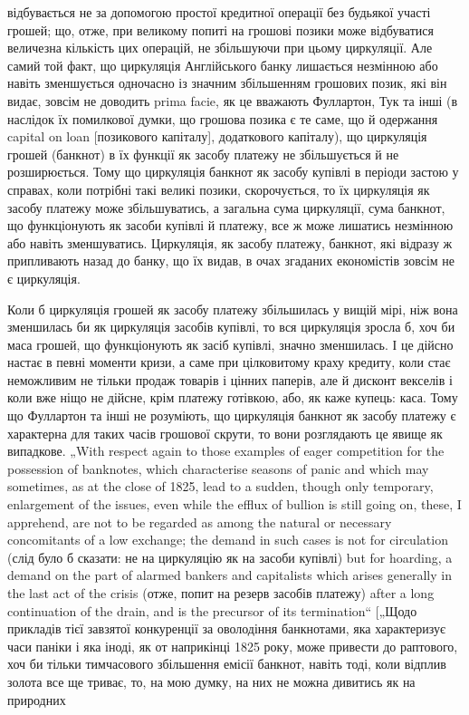 \parcont{}  %
відбувається не за допомогою простої кредитної операції без
будьякої участі грошей; що, отже, при великому попиті на грошові
позики може відбуватися величезна кількість цих операцій,
не збільшуючи при цьому циркуляції. Але самий той факт,
що циркуляція Англійського банку лишається незмінною або
навіть зменшується одночасно із значним збільшенням грошових
позик, які він видає, зовсім не доводить prima facie,
як це вважають Фуллартон, Тук та інші (в наслідок їх
помилкової думки, що грошова позика є те саме, що й одержання
capital on loan [позикового капіталу], додаткового капіталу), що
циркуляція грошей (банкнот) в їх функції як засобу платежу
не збільшується й не розширюється. Тому що циркуляція банкнот
як засобу купівлі в періоди застою у справах, коли потрібні такі
великі позики, скорочується, то їх циркуляція як засобу платежу
може збільшуватись, а загальна сума циркуляції, сума банкнот,
що функціонують як засоби купівлі й платежу, все ж може
лишатись незмінною або навіть зменшуватись. Циркуляція, як
засобу платежу, банкнот, які відразу ж припливають назад до
банку, що їх видав, в очах згаданих економістів зовсім не є
циркуляція.

Коли б циркуляція грошей як засобу платежу збільшилась
у вищій мірі, ніж вона зменшилась би як циркуляція засобів
купівлі, то вся циркуляція зросла б, хоч би маса грошей,
що функціонують як засіб купівлі, значно зменшилась. І це
дійсно настає в певні моменти кризи, а саме при цілковитому
краху кредиту, коли стає неможливим не тільки продаж товарів
і цінних паперів, але й дисконт векселів і коли вже ніщо не
дійсне, крім платежу готівкою, або, як каже купець: каса. Тому
що Фуллартон та інші не розуміють, що циркуляція банкнот як
засобу платежу є характерна для таких часів грошової скрути,
то вони розглядають це явище як випадкове. „With respect again
to those examples of eager competition for the possession of banknotes,
which characterise seasons of panic and which may sometimes,
as at the close of 1825, lead to a sudden, though only temporary,
enlargement of the issues, even while the efflux of bullion
is still going on, these, I apprehend, are not to be regarded as
among the natural or necessary concomitants of a low exchange; the
demand in such cases is not for circulation (слід було б сказати:
не на циркуляцію як на засоби купівлі) but for hoarding, a demand
on the part of alarmed bankers and capitalists which arises
generally in the last act of the crisis (отже, попит на резерв засобів
платежу) after a long continuation of the drain, and is the
precursor of its termination“ [„Щодо прикладів тієї завзятої конкуренції
за оволодіння банкнотами, яка характеризує часи
паніки і яка іноді, як от наприкінці 1825 року, може привести
до раптового, хоч би тільки тимчасового збільшення
емісії банкнот, навіть тоді, коли відплив золота все ще триває,
то, на мою думку, на них не можна дивитись як на природних
\parbreak{}  %

